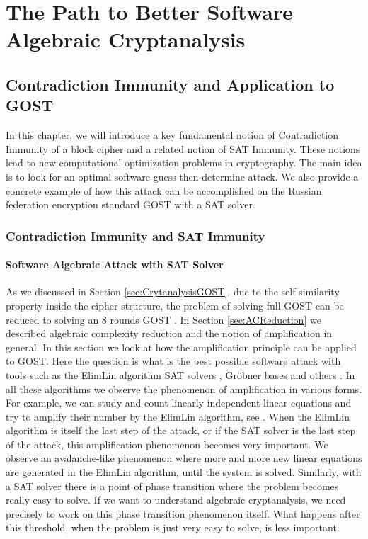 \part{The Path to Better Software Algebraic Cryptanalysis}
\chapter{Contradiction Immunity and Application to GOST}\label{ch:GOST}



In this chapter, we will introduce a key fundamental notion of Contradiction Immunity of a block cipher and a related notion of SAT Immunity. These notions lead to new computational optimization problems in cryptography. The main idea is to look for an optimal software guess-then-determine attack. We also provide a concrete example of how this attack can be accomplished on the Russian federation encryption standard GOST with a SAT solver. 

\section{Contradiction Immunity and SAT Immunity}

\subsection{Software Algebraic Attack with SAT Solver} \label{sec:SoftAlgAttackSAT}
As we discussed in Section \ref{sec:CrytanalysisGOST}, due to the self similarity property inside the cipher structure, the problem of solving full GOST can be reduced to solving an 8 rounds GOST \cite{gostac}. In Section \ref{sec:ACReduction} we described algebraic complexity reduction and the notion of amplification in general. In this section we look at how the amplification principle can be applied to GOST. Here the question is what is the best possible software attack with tools such as the ElimLin algorithm \cite{AlgSnowCourtoisDebraize,DEScourtois,ElimLinR} SAT solvers \cite{OptimiPaper,BardCourtoiJeffersonConv}, Gr\"{o}bner bases \cite{grobner} and others \cite{SemaevSparseJournalPaper}. In all these algorithms we observe the phenomenon of amplification in various forms. For example, we can study and count linearly independent linear equations and try to amplify their number
by the ElimLin algorithm, see \cite{AlgSnowCourtoisDebraize,DEScourtois,ElimLinR}.
When the ElimLin algorithm is itself the last step of the attack, or if the SAT solver is the last step of the attack, this amplification phenomenon becomes very important. We observe an avalanche-like phenomenon where more and more new linear equations are generated in the ElimLin algorithm, until the system is solved. Similarly, with a SAT solver there is a point of phase transition
where the problem becomes really easy to solve. If we want to understand algebraic cryptanalysis, we need precisely to work
on this phase transition phenomenon itself. What happens after this threshold, when the problem is just very easy to solve,
is less important.

